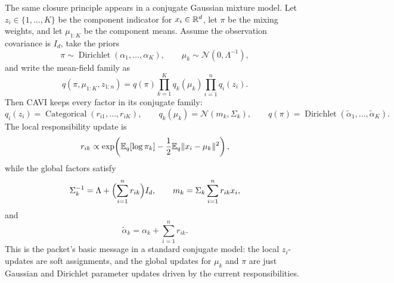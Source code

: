 \begin{example}
\label{ex:mfvi-gmm}
The same closure principle appears in a conjugate Gaussian mixture model.
Let \(z_i\in\{1,\dots,K\}\) be the component indicator for \(x_i\in\mathbb{R}^d\), let \(\pi\) be the mixing weights, and let \(\mu_{1:K}\) be the component means.
Assume the observation covariance is \(I_d\), take the priors
\[
  \pi \sim \operatorname{Dirichlet}(\alpha_1,\dots,\alpha_K),
  \qquad
  \mu_k \sim \mathcal{N}(0,\Lambda^{-1}),
\]
and write the mean-field family as
\[
  q(\pi,\mu_{1:K},z_{1:n})
  =
  q(\pi)\prod_{k=1}^K q_k(\mu_k)\prod_{i=1}^n q_i(z_i).
\]
Then CAVI keeps every factor in its conjugate family:
\[
  q_i(z_i)
  =
  \operatorname{Categorical}(r_{i1},\dots,r_{iK}),
  \qquad
  q_k(\mu_k)
  =
  \mathcal{N}(m_k,\Sigma_k),
  \qquad
  q(\pi)
  =
  \operatorname{Dirichlet}(\widetilde\alpha_1,\dots,\widetilde\alpha_K).
\]
The local responsibility update is
\[
  r_{ik}
  \propto
  \exp\!\left(
    \mathbb{E}_q[\log \pi_k]
    -
    \frac12 \mathbb{E}_q \lVert x_i-\mu_k\rVert^2
  \right),
\]
while the global factors satisfy
\[
  \Sigma_k^{-1}
  =
  \Lambda + \Bigl(\sum_{i=1}^n r_{ik}\Bigr) I_d,
  \qquad
  m_k
  =
  \Sigma_k \sum_{i=1}^n r_{ik}x_i,
\]
and
\[
  \widetilde\alpha_k
  =
  \alpha_k + \sum_{i=1}^n r_{ik}.
\]
This is the packet's basic message in a standard conjugate model:
the local \(z_i\)-updates are soft assignments, and the global updates for \(\mu_k\) and \(\pi\) are just Gaussian and Dirichlet parameter updates driven by the current responsibilities.
\end{example}

